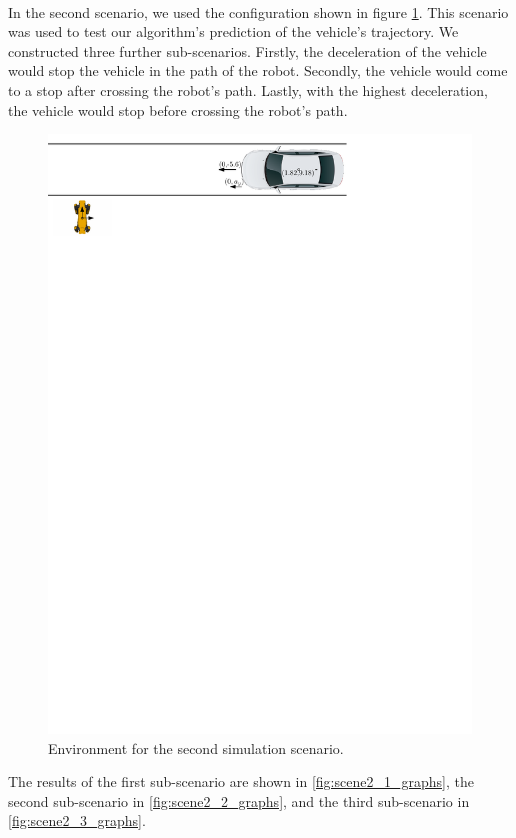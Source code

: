         \\
            In the second scenario, we used the configuration shown in figure \ref{fig:scene2}. This scenario was used to test our algorithm's prediction of the vehicle's trajectory. We constructed three further sub-scenarios. Firstly, the deceleration of the vehicle would stop the vehicle in the path of the robot. Secondly, the vehicle would come to a stop after crossing the robot's path. Lastly, with the highest deceleration, the vehicle would stop before crossing the robot's path.\\
            \begin{figure}[H]
                \centering
                \includegraphics[width=0.95\linewidth]{images/simulations/scene2.pdf}
                \caption{Environment for the second simulation scenario.}
                \label{fig:scene2}
            \end{figure}
            The results of the first sub-scenario are shown in \ref{fig:scene2_1_graphs}, the second sub-scenario in \ref{fig:scene2_2_graphs}, and the third sub-scenario in \ref{fig:scene2_3_graphs}.
